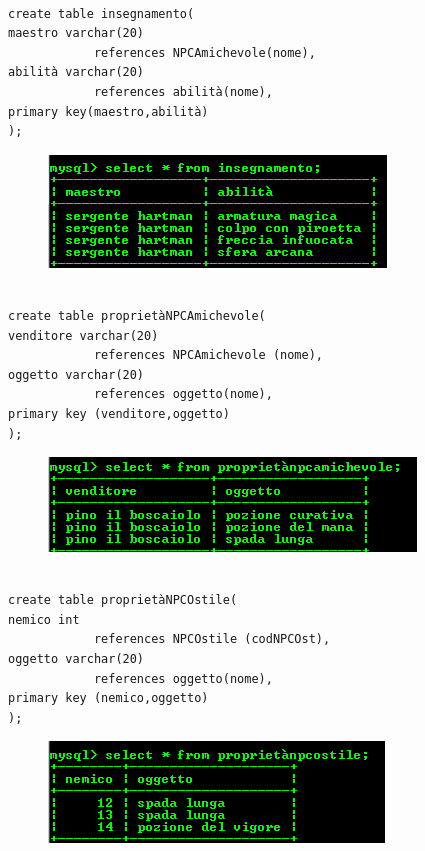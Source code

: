 \begin{verbatim}

create table insegnamento(
maestro varchar(20) 
			references NPCAmichevole(nome), 
abilità varchar(20) 
			references abilità(nome), 
primary key(maestro,abilità)
);
\end{verbatim}

\begin{figure}[H]
\centering
\includegraphics[width=0.7\linewidth]{immagini/23}
\caption{}
\label{fig:1}
\end{figure}

\begin{verbatim}

create table proprietàNPCAmichevole( 
venditore varchar(20) 
			references NPCAmichevole (nome), 
oggetto varchar(20) 
			references oggetto(nome), 
primary key (venditore,oggetto)
);
\end{verbatim}

\begin{figure}[H]
\centering
\includegraphics[width=0.7\linewidth]{immagini/24}
\caption{}
\label{fig:1}
\end{figure}

\begin{verbatim}

create table proprietàNPCOstile( 
nemico int 
			references NPCOstile (codNPCOst), 
oggetto varchar(20) 
			references oggetto(nome), 
primary key (nemico,oggetto)
);
\end{verbatim}

\begin{figure}[H]
\centering
\includegraphics[width=0.7\linewidth]{immagini/25}
\caption{}
\label{fig:1}
\end{figure}

